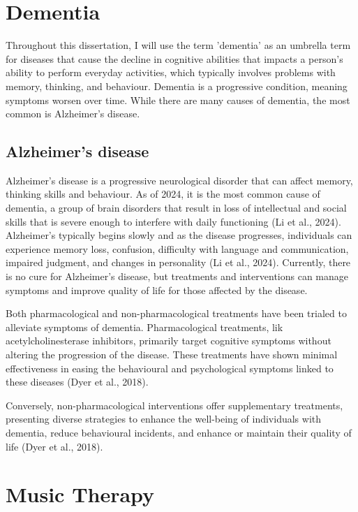 \documentclass{l4proj}
\begin{document}
\section{Dementia}

Throughout this dissertation, I will use the term 'dementia' as an umbrella term for diseases that cause the decline in cognitive abilities that impacts a person's ability to perform everyday activities, which typically involves problems with memory, thinking, and behaviour.  Dementia is a progressive condition, meaning symptoms worsen over time. While there are many causes of dementia, the most common is Alzheimer's disease.

\subsection{Alzheimer's disease}
Alzheimer's disease is a progressive neurological disorder that can affect memory, thinking skills and behaviour. As of 2024, it is the most common cause of dementia, a group of brain disorders that result in loss of intellectual and social skills that is severe enough to interfere with daily functioning (Li et al., 2024). Alzheimer's typically begins slowly and as the disease progresses, individuals can experience memory loss, confusion, difficulty with language and communication, impaired judgment, and changes in personality (Li et al., 2024). Currently, there is no cure for Alzheimer's disease, but treatments and interventions can manage symptoms and improve quality of life for those affected by the disease.

Both pharmacological and non-pharmacological treatments have been trialed to alleviate symptoms of dementia. Pharmacological treatments, lik acetylcholinesterase inhibitors, primarily target cognitive symptoms without altering the progression of the disease. These treatments have shown minimal effectiveness in easing the behavioural and psychological symptoms linked to these diseases (Dyer et al., 2018).

Conversely, non-pharmacological interventions offer supplementary treatments, presenting diverse strategies to enhance the well-being of individuals with dementia, reduce behavioural incidents, and enhance or maintain their quality of life (Dyer et al., 2018).

\section{Music Therapy}\label{sec:music_therapy}
\end{document}
